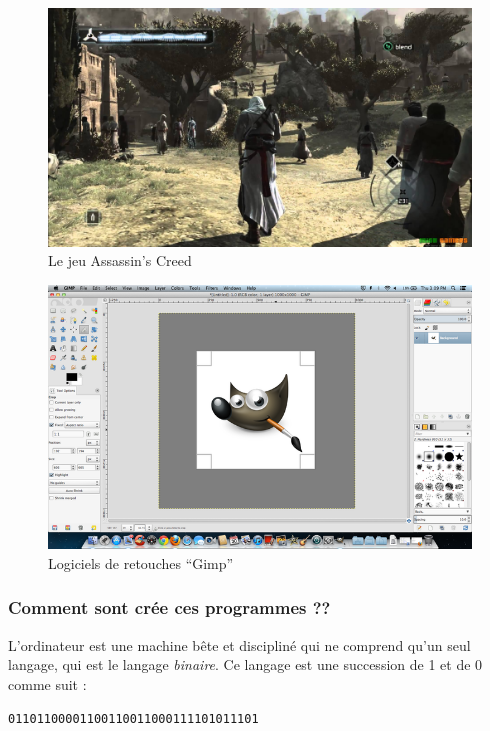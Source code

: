 \documentclass[12pt]{article}
\begin{document}
            \begin{figure}[H]
                \centering
                \includegraphics[width=\textwidth]{img/3_assassins_creed.jpg}
                \caption{Le jeu Assassin's Creed}
            \end{figure}
            \begin{figure}[H]
                \centering
                \includegraphics[width=\textwidth]{img/4_gimp.png}
                \caption{Logiciels de retouches ``Gimp''}
            \end{figure}

        \subsubsection{Comment sont crée ces programmes ??}
            L'ordinateur est une machine bête et discipliné qui ne comprend qu'un seul langage, qui est le langage
            \emph{binaire}. Ce langage est une succession de 1 et de 0 comme suit : 
            \begin{lstlisting}[style=code,numbers=none]
01101100001100110011000111101011101
            \end{lstlisting}
            
\end{document}
